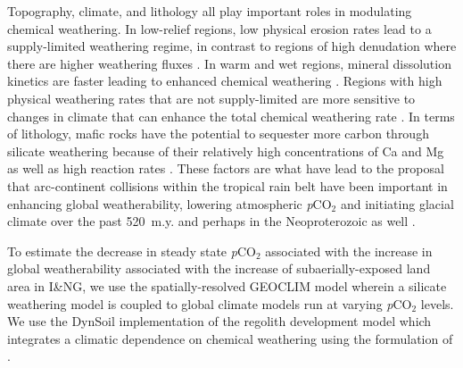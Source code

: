 \documentclass[11pt,letterpaper]{article}
\newcommand{\pCOtwo}{\textit{p}CO$_{2}$\xspace}
\begin{document}
Topography, climate, and lithology all play important roles in modulating chemical weathering. In low-relief regions, low physical erosion rates lead to a supply-limited weathering regime, in contrast to regions of high denudation where there are higher weathering fluxes \citep{Gabet2009a, West2012a, Maher2014a}. In warm and wet regions, mineral dissolution kinetics are faster leading to enhanced chemical weathering \citep{Lasaga1994a, West2012a}. Regions with high physical weathering rates that are not supply-limited are more sensitive to changes in climate that can enhance the total chemical weathering rate \citep{West2012a, Maher2014a}. In terms of lithology, mafic rocks have the potential to sequester more carbon through silicate weathering because of their relatively high concentrations of Ca and Mg as well as high reaction rates \citep{Dessert2003a}. These factors are what have lead to the proposal that arc-continent collisions within the tropical rain belt have been important in enhancing global weatherability, lowering atmospheric \pCOtwo and initiating glacial climate over the past 520~m.y. \citep{Jagoutz2016a, Swanson-Hysell2017a, Macdonald2019a} and perhaps in the Neoproterozoic as well \citep{Park2019a}.

To estimate the decrease in steady state \pCOtwo associated with the increase in global weatherability associated with the increase of subaerially-exposed land area in I\&NG, we use the spatially-resolved GEOCLIM model \citep{Godderis2014a, Godderis2017c} wherein a silicate weathering model is coupled to global climate models run at varying \pCOtwo levels. We use the DynSoil implementation of the \citet{Gabet2009a} regolith development model which integrates a climatic dependence on chemical weathering using the formulation of \cite{West2012a}.
\end{document}
